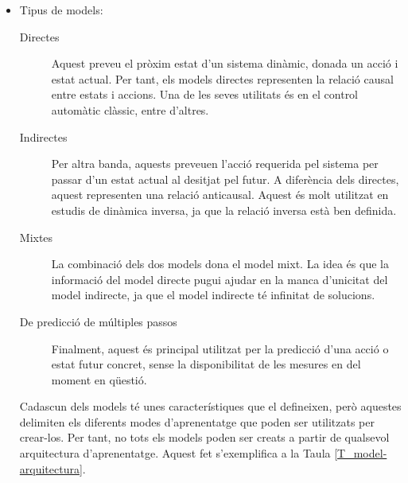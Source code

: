 \documentclass[12pt,a4paper,final,twoside]{article}
\begin{document}
\begin{itemize}
\item Tipus de models:

\begin{description}

\item[Directes] Aquest preveu el pròxim estat d'un sistema dinàmic, donada un acció i estat actual. Per tant, els models directes representen la relació causal entre estats i accions. Una de les seves utilitats és en el control automàtic clàssic, entre d'altres.

\item[Indirectes] Per altra banda, aquests preveuen l'acció requerida pel sistema per passar d'un estat actual al desitjat pel futur. A diferència dels directes, aquest representen una relació anticausal. Aquest és molt utilitzat en estudis de dinàmica inversa, ja que la relació inversa està ben definida.

\item[Mixtes] La combinació dels dos models dona el model mixt. La idea és que la informació del model directe pugui ajudar en la manca d'unicitat del model indirecte, ja que el model indirecte té infinitat de solucions. 

\item[De predicció de múltiples passos] Finalment, aquest és principal utilitzat per la predicció d'una acció o estat futur concret, sense la disponibilitat de les mesures en del moment en qüestió.

\end{description}

Cadascun dels models té unes característiques que el defineixen, però aquestes delimiten els diferents modes d'aprenentatge que poden ser utilitzats per crear-los. Per tant, no tots els models poden ser creats a partir de qualsevol arquitectura d'aprenentatge. Aquest fet s'exemplifica a la Taula \ref{T_model-arquitectura}.

\end{itemize}
\end{document}
